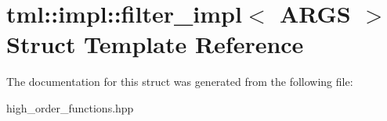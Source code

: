 \hypertarget{structtml_1_1impl_1_1filter__impl}{\section{tml\+:\+:impl\+:\+:filter\+\_\+impl$<$ A\+R\+G\+S $>$ Struct Template Reference}
\label{structtml_1_1impl_1_1filter__impl}
}


The documentation for this struct was generated from the following file\+:\begin{DoxyCompactItemize}
\item 
high\+\_\+order\+\_\+functions.\+hpp\end{DoxyCompactItemize}
